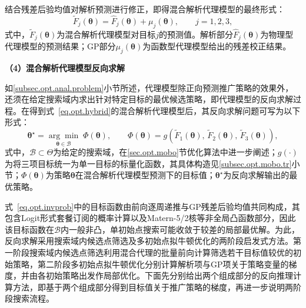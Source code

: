 结合残差后验均值对解析预测进行修正，即得混合解析代理模型的最终形式：
\begin{equation}
\tilde{F}_{j}\left(\bm{\theta}\right)=\hat{F}_{j}\left(\bm{\theta}\right)+\mu_{j}\left(\bm{\theta}\right),\qquad j=1,2,3,
\label{eq.opt.hybrid}
\end{equation}
式中，$\tilde{F}_{j}\left(\bm{\theta}\right)$为混合解析代理模型对目标$j$的预测值。解析部分$\hat{F}_{j}\left(\bm{\theta}\right)$为物理型代理模型的预测结果；GP部分$\mu_{j}\left(\bm{\theta}\right)$为函数型代理模型给出的残差校正结果。

\textbf{（4）混合解析代理模型反向求解}

如\ref{subsec.opt.anal.problem}小节所述，代理模型除正向预测推广策略的效果外，还须在给定搜索域内求出针对特定目标的最优候选策略，即代理模型的反向求解过程。在得到式~\eqref{eq.opt.hybrid}的混合解析代理模型后，其反向求解问题可写为以下形式：
\begin{equation}
\bm{\theta}^{\star}=\underset{\bm{\theta}\in\mathcal{B}}{\arg\min}\;\Phi\left(\bm{\theta}\right),\qquad
\Phi\left(\bm{\theta}\right)=g\left(\tilde{F}_{1}\left(\bm{\theta}\right),\,\tilde{F}_{2}\left(\bm{\theta}\right),\,\tilde{F}_{3}\left(\bm{\theta}\right)\right),
\label{eq.opt.invprob}
\end{equation}
式中，$\mathcal{B}\subset\Theta$为给定的搜索域，在\ref{sec.opt.mobo}节优化算法中进一步阐述；$g\left(\cdot\right)$为将三项目标统一为单一目标的标量化函数，其具体构造见\ref{subsec.opt.mobo.tr}小节；$\Phi\left(\bm{\theta}\right)$为策略$\bm{\theta}$在混合解析代理模型预测下的目标值；$\bm{\theta}^{\star}$为反向求解输出的最优策略。

式~\eqref{eq.opt.invprob}中的目标函数由前向逐周递推与GP残差后验均值共同构成，其包含Logit形式套餐订阅的概率计算以及Matern-5/2核等非全局凸函数部分，因此该目标函数在$\mathcal B$内一般非凸，单初始点搜索可能收敛于较差的局部最优解。为此，反向求解采用搜索域内候选点筛选及多初始点拟牛顿优化的两阶段启发式方法。第一阶段搜索域内候选点筛选利用混合代理的批量前向计算筛选若干目标值较优的初始策略，第二阶段多初始点拟牛顿优化分别计算解析项与GP项关于策略变量的梯度，并由各初始策略出发作局部优化。下面先分别给出两个组成部分的反向推理计算方法，即基于两个组成部分得到目标值关于推广策略的梯度，再进一步说明两阶段搜索流程。

